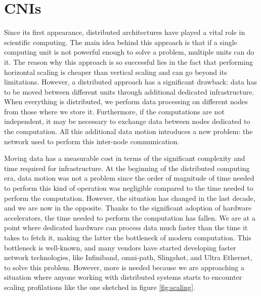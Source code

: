 \chapter{CNIs}\label{chpt:cni}

\label{sec:network}

Since its first appearance, distributed architectures have played a vital role
in scientific computing.
The main idea behind this approach is that if a single computing unit is not
powerful enough to solve a problem, multiple units can do it.
The reason why this approach is so successful lies in the fact that performing
horizontal scaling is cheaper than vertical scaling and can go beyond its
limitations.
However, a distributed approach has a significant drawback: data has to be moved
between different units through additional dedicated infrastructure.
When everything is distributed, we perform data processing on different nodes
from those where we store it.
Furthermore, if the computations are not independent, it may be necessary to
exchange data between nodes dedicated to the computation.
All this additional data motion introduces a new problem: the network used to
perform this inter-node communication.

Moving data has a measurable cost in terms of the significant complexity and
time required for infrastructure.
At the beginning of the distributed computing era, data motion was not a problem
since the order of magnitude of time needed to perform this kind of operation
was negligible compared to the time needed to perform the computation.
However, the situation has changed in the last decade, and we are now in the
opposite.
Thanks to the significant adoption of hardware accelerators, the time needed to
perform the computation has fallen.
We are at a point where dedicated hardware can process data much faster than the
time it takes to fetch it, making the latter the bottleneck of modern
computation.
This bottleneck is well-known, and many vendors have started developing faster
network technologies, like Infiniband, omni-path, Slingshot, and Ultra Ethernet,
to solve this problem. However, more is needed because we are approaching a
situation where anyone working with distributed systems starts to encounter
scaling profilations like the one sketched in figure \ref{fig:scaling}.

